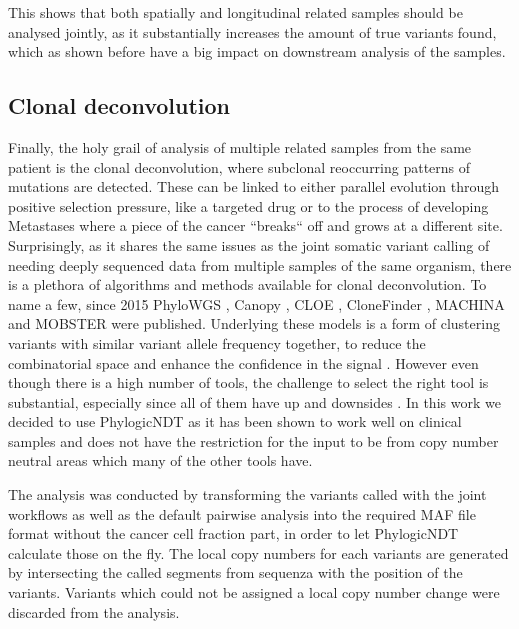 This shows that both spatially and longitudinal related samples should be analysed jointly, as it substantially increases the amount of true variants found, which as shown before have a big impact on downstream analysis of the samples.



\subsection[Clonal deconvolution]{Clonal deconvolution}
\label{variantcalling-sec:clonal}

Finally, the holy grail of analysis of multiple related samples from the same patient is the clonal deconvolution, where subclonal reoccurring patterns of mutations are detected. These can be linked to either parallel evolution through positive selection pressure, like a targeted drug or to the process of developing Metastases where a piece of the cancer ``breaks`` off and grows at a different site.
Surprisingly, as it shares the same issues as the joint somatic variant calling of needing deeply sequenced data from multiple samples of the same organism, there is a plethora of algorithms and methods available for clonal deconvolution. To name a few, since 2015 PhyloWGS \cite{Deshwar2015}, Canopy \cite{Jiang2016}, CLOE \cite{Marass2016}, CloneFinder \cite{Miura2018}, MACHINA \cite{ElKebir2018} and MOBSTER \cite{Caravagna2020} were published. Underlying these models is a form of clustering variants with similar variant allele frequency together, to reduce the combinatorial space and enhance the confidence in the signal \cite{Tarabichi2021}. However even though there is a high number of tools, the challenge to select the right tool is substantial, especially since all of them have up and downsides \cite{Miura2020}. In this work we decided to use PhylogicNDT \cite{Leshchiner2018} as it has been shown to work well on clinical samples \cite{Gerstung2020} and does not have the restriction for the input to be from copy number neutral areas which many of the other tools have.

The analysis was conducted by transforming the variants called with the joint workflows as well as the default pairwise analysis into the required MAF file format without the cancer cell fraction part, in order to let PhylogicNDT calculate those on the fly. The local copy numbers for each variants are generated by intersecting the called segments from sequenza with the position of the variants. Variants which could not be assigned a local copy number change were discarded from the analysis.

